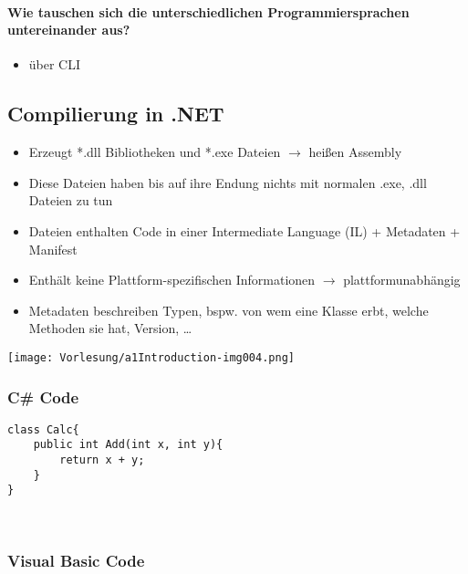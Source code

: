 \paragraph{Wie tauschen sich die unterschiedlichen Programmiersprachen untereinander aus?}

\begin{itemize}
\item über CLI
\end{itemize}

\subsection{Compilierung in .NET}

\begin{itemize}
\item Erzeugt *.dll Bibliotheken und *.exe Dateien $\to$ heißen Assembly
\item Diese Dateien haben bis auf ihre Endung nichts mit normalen .exe, .dll Dateien zu tun
\item Dateien enthalten Code in einer Intermediate Language (IL) + Metadaten + Manifest
\item Enthält keine Plattform-spezifischen Informationen $\to$ plattformunabhängig
\item Metadaten beschreiben Typen, bspw. von wem eine Klasse erbt, welche Methoden sie hat, Version, …
\end{itemize}
\begin{center}
\texttt{[image: Vorlesung/a1Introduction-img004.png]} 
\end{center}

\subsubsection{C\# Code}

\begin{lstlisting}[language={[Sharp]C}]
class Calc{
	public int Add(int x, int y){
		return x + y;
	}
}
\end{lstlisting}

~

\subsubsection{Visual Basic Code}

